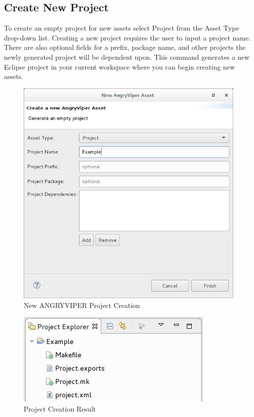 \subsection{Create New Project}
\label{sec:create_project}
\begin{flushleft}

To create an empty project for new assets select Project from the Asset Type drop-down list. Creating a new project requires the user to input a project name. There are also optional fields for a prefix, package name, and other projects the newly generated project will be dependent upon. This command generates a new Eclipse project in your current workspace where you can begin creating new assets.\newline
\begin{figure}[h!]
  \centering
  \includegraphics[scale=0.5]{figures/createproject.jpg}
  \caption{New ANGRYVIPER Project Creation}
  \label{fig:figure2}
\end{figure}

\begin{figure}[h!]
  \centering
  \includegraphics[scale=0.5]{figures/projectresult.jpg}
  \caption{Project Creation Result}
  \label{fig:figure3}
\end{figure}

\end{flushleft}

